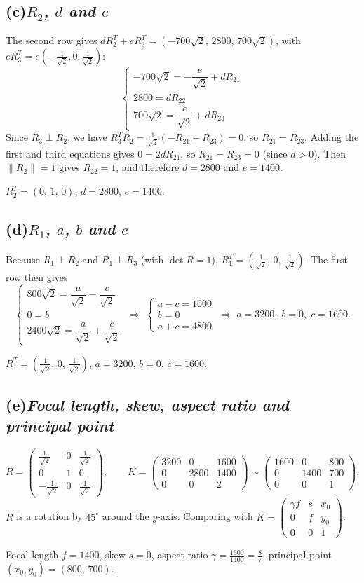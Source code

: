 \documentclass[11pt,a4paper]{article}
\newcommand{\vect}[1]{
    \begin{pmatrix}#1
\end{pmatrix}}
\newcommand{\task}[2]{
\subsection*{#1\quad\normalfont\textit{#2}}}
\begin{document}
\task{(c)}{$R_2$, $d$ and $e$}

The second row gives $dR_2^T + eR_3^T = (-700\sqrt2,\,2800,\,700\sqrt2)$, with
$eR_3^T = e\left(-\tfrac{1}{\sqrt2},0,\tfrac{1}{\sqrt2}\right)$:
\[
    \begin{cases}
        -700\sqrt2 = -\dfrac{e}{\sqrt2} + dR_{21}\\[6pt]
        2800 = dR_{22}\\[2pt]
        700\sqrt2 = \dfrac{e}{\sqrt2} + dR_{23}
    \end{cases}
\]
Since $R_3 \perp R_2$, we have $R_3^TR_2 = \tfrac{1}{\sqrt2}(-R_{21}
+ R_{23}) = 0$, so $R_{21} = R_{23}$.
Adding the first and third equations gives $0 = 2dR_{21}$, so $R_{21}
= R_{23} = 0$ (since $d > 0$).
Then $\|R_2\| = 1$ gives $R_{22} = 1$, and therefore $d = 2800$ and $e = 1400$.
\begin{answer}
    $R_2^T = (0,\,1,\,0)$, \quad $d = 2800$, \quad $e = 1400$.
\end{answer}

\task{(d)}{$R_1$, $a$, $b$ and $c$}

Because $R_1 \perp R_2$ and $R_1 \perp R_3$ (with $\det R = 1$),
$R_1^T = \left(\tfrac{1}{\sqrt2},\,0,\,\tfrac{1}{\sqrt2}\right)$. The
first row then gives
\[
    \begin{cases}
        800\sqrt2 = \dfrac{a}{\sqrt2} - \dfrac{c}{\sqrt2}\\[6pt]
        0 = b\\[2pt]
        2400\sqrt2 = \dfrac{a}{\sqrt2} + \dfrac{c}{\sqrt2}
    \end{cases}
    \;\Longrightarrow\;
    \begin{cases}
        a - c = 1600\\
        b = 0\\
        a + c = 4800
    \end{cases}
    \;\Longrightarrow\;
    a = 3200,\; b = 0,\; c = 1600.
\]
\begin{answer}
    $R_1^T = \left(\tfrac{1}{\sqrt2},\,0,\,\tfrac{1}{\sqrt2}\right)$,
    \quad $a = 3200$, \quad $b = 0$, \quad $c = 1600$.
\end{answer}

\task{(e)}{Focal length, skew, aspect ratio and principal point}

\[
    R =
    \vect{\tfrac{1}{\sqrt2}&0&\tfrac{1}{\sqrt2}\\[2pt]0&1&0\\[2pt]-\tfrac{1}{\sqrt2}&0&\tfrac{1}{\sqrt2}},
    \qquad
    K = \vect{3200&0&1600\\0&2800&1400\\0&0&2}
    \sim \vect{1600&0&800\\0&1400&700\\0&0&1}.
\]
$R$ is a rotation by $45^\circ$ around the $y$-axis. Comparing with
$K = \vect{\gamma f & s & x_0\\ 0 & f & y_0\\ 0&0&1}$:
\begin{answer}
    Focal length $f = 1400$, \quad skew $s = 0$, \quad aspect ratio
    $\gamma = \tfrac{1600}{1400} = \tfrac{8}{7}$,
    \quad principal point $(x_0, y_0) = (800,\,700)$.
\end{answer}
\end{document}
